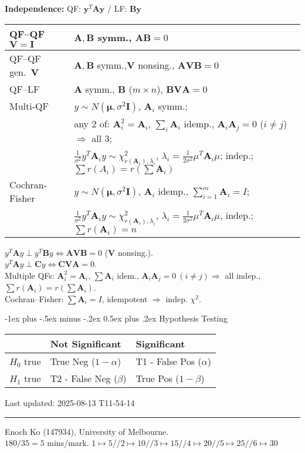 \documentclass[10pt,landscape]{article}
\makeatletter
\renewcommand{\subsection}{\@startsection{subsection}{2}{0mm}%
                                {-1ex plus -.5ex minus -.2ex}%
                                {0.5ex plus .2ex}%
                                {\normalfont\small\bfseries}}
\makeatother
\begin{document}
\begin{multicols}{3}
\medskip
\textbf{Independence:} QF: $\mathbf{y}^T\mathbf{A}\mathbf{y}$ / LF: $\mathbf{B}\mathbf{y}$
\begin{tabular}{|p{1.3cm}|p{5.7cm}|}
\hline
QF–QF $\mathbf{V}=\mathbf{I}$& $\mathbf{A},\mathbf{B}$ symm., $\mathbf{A}\mathbf{B}=0$\\
\hline
QF–QF gen.\ $\mathbf{V}$& $\mathbf{A},\mathbf{B}$ symm.,$\mathbf{V}$ nonsing., $\mathbf{A}\mathbf{V}\mathbf{B}=0$\\
\hline
QF–LF & $\mathbf{A}$ symm., $\mathbf{B}$ ($m\times n$), $\mathbf{B}\mathbf{V}\mathbf{A}=0$\\
\hline
Multi-QF & $y\!\sim\! N(\boldsymbol\mu,\sigma^2\mathbf{I})$, $\mathbf{A}_i$ symm.;\\
& any 2 of: $\mathbf{A}_i^2=\mathbf{A}_i$, $\sum_i \mathbf{A}_i$ idemp., $\mathbf{A}_i\mathbf{A}_j=0$ ($i\neq j$) $\Rightarrow$ all 3;\\
& $\frac{1}{\sigma^2}y^T \mathbf{A}_i y \sim \chi^2_{r(\mathbf{A}_i),\lambda_i}$, $\lambda_i=\frac{1}{2\sigma^2}\mu^T \mathbf{A}_i \mu$;
indep.;
$\sum r(A_i)=r(\sum \mathbf{A}_i)$\\
\hline
Cochran-Fisher & $y\!\sim\! N(\boldsymbol\mu,\sigma^2\mathbf{I})$, $\mathbf{A}_i$ idemp., $\sum_{i=1}^m \mathbf{A}_i=I$;\\
& $\frac{1}{\sigma^2}y^T \mathbf{A}_i y \sim \chi^2_{r(\mathbf{A}_i),\lambda_i}$, $\lambda_i=\frac{1}{2\sigma^2}\mu^T \mathbf{A}_i \mu$, indep.; $\sum r(\mathbf{A}_i)=n$\\
\hline
\end{tabular}

\medskip
$y^T \mathbf{A} y \perp y^T \mathbf{B} y \Leftrightarrow \mathbf{A}\mathbf{V}\mathbf{B} = 0$ ($\mathbf{V}$ nonsing.).\\
$y^T \mathbf{A} y \perp \mathbf{C} y \Leftrightarrow \mathbf{C}\mathbf{V}\mathbf{A} = 0$.\\
\medskip
Multiple QFs: $\mathbf{A}_i^2 = \mathbf{A}_i$, $\sum \mathbf{A}_i$ idem., $\mathbf{A}_i \mathbf{A}_j=0 \ (i\neq j) \Rightarrow$ all indep., $\sum r(\mathbf{A}_i)=r(\sum \mathbf{A}_i)$.\\
Cochran–Fisher: $\sum \mathbf{A}_i = I$, idempotent $\Rightarrow$ indep. $\chi^2$.\\
\medskip

\subsection{Hypothesis Testing}
\begin{tabular}{|l|l|l|}\hline
& Not Significant& Significant\\\hline
$H_0$ true&True Neg ($1-\alpha$)& T1 - False Pos ($\alpha$)\\\hline
$H_1$ true&T2 - False Neg ($\beta$)& True Pos ($1-\beta$)\\ \hline
\end{tabular}


\vfill
Last updated:
2025-08-13 T11-54-14
\hrule
Enoch Ko (147934), University of Melbourne.\\
$180/35 = 5$ mins/mark. $1 \mapsto 5 // 2 \mapsto 10 //3 \mapsto 15 // 4 \mapsto 20 // 5 \mapsto 25 // 6 \mapsto 30$\\
\end{multicols}
\end{document}
